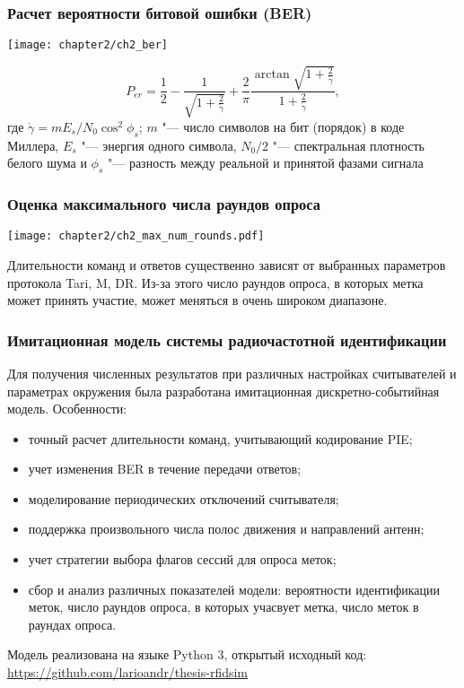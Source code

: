 \begin{frame}
    \frametitle{Расчет вероятности битовой ошибки (BER)}
    \begin{center}
        \texttt{[image: chapter2/ch2\_ber]}
    \end{center}
    $$
	    P_{er} = \frac{1}{2} - \frac{1}{\sqrt{1+\frac{2}{\acute{\gamma}}}} +
		    	 \frac{2}{\pi}\frac{\arctan{\sqrt{1+\frac{2}{\acute{\gamma}}}}}{1+\frac{2}{\acute{\gamma}}},
    $$
    где $\acute{\gamma} = mE_s/N_0\cos^2{\phi_s}$; $m$ "--- число символов на бит (порядок) в коде Миллера, $E_s$ "--- энергия одного символа, $N_0/2$ "--- спектральная плотность белого шума и $\phi_s$ "--- разность между реальной и принятой фазами сигнала
    \vfill
\end{frame}


\begin{frame}
    \frametitle{Оценка максимального числа раундов опроса}
    \begin{center}
        \texttt{[image: chapter2/ch2\_max\_num\_rounds.pdf]}
    \end{center}
    Длительности команд и ответов существенно зависят от выбранных параметров протокола Tari, M, DR. Из-за этого число раундов опроса, в которых метка может принять участие, может меняться в очень широком диапазоне.
\end{frame}

\begin{frame}
    \frametitle{Имитационная модель системы радиочастотной идентификации}
    Для получения численных результатов при различных настройках считывателей и параметрах окружения была разработана имитационная дискретно-событийная модель. Особенности:

    \begin{itemize}
        \item точный расчет длительности команд, учитывающий кодирование PIE;
        \item учет изменения BER в течение передачи ответов;
        \item моделирование периодических отключений считывателя;
        \item поддержка произвольного числа полос движения и направлений антенн;
        \item учет стратегии выбора флагов сессий для опроса меток;
        \item сбор и анализ различных показателей модели: вероятности идентификации меток, число раундов опроса, в которых учасвует метка, число меток в раундах опроса.
    \end{itemize}

    Модель реализована на языке Python 3, открытый исходный код: \url{https://github.com/larioandr/thesis-rfidsim}
\end{frame}

